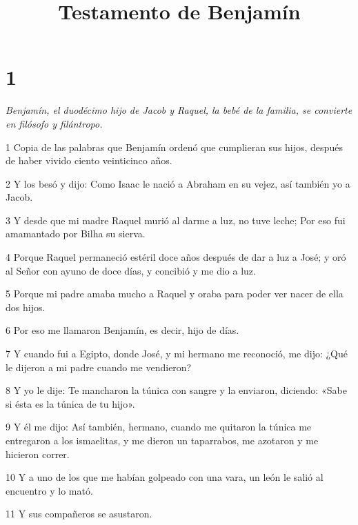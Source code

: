 

\title{Testamento de Benjamín}

\chapter{1}

\par \textit{Benjamín, el duodécimo hijo de Jacob y Raquel, la bebé de la familia, se convierte en filósofo y filántropo.}

\par 1 Copia de las palabras que Benjamín ordenó que cumplieran sus hijos, después de haber vivido ciento veinticinco años.

\par 2 Y los besó y dijo: Como Isaac le nació a Abraham en su vejez, así también yo a Jacob.

\par 3 Y desde que mi madre Raquel murió al darme a luz, no tuve leche; Por eso fui amamantado por Bilha su sierva.

\par 4 Porque Raquel permaneció estéril doce años después de dar a luz a José; y oró al Señor con ayuno de doce días, y concibió y me dio a luz.

\par 5 Porque mi padre amaba mucho a Raquel y oraba para poder ver nacer de ella dos hijos.

\par 6 Por eso me llamaron Benjamín, es decir, hijo de días.

\par 7 Y cuando fui a Egipto, donde José, y mi hermano me reconoció, me dijo: ¿Qué le dijeron a mi padre cuando me vendieron?

\par 8 Y yo le dije: Te mancharon la túnica con sangre y la enviaron, diciendo: «Sabe si ésta es la túnica de tu hijo».

\par 9 Y él me dijo: Así también, hermano, cuando me quitaron la túnica me entregaron a los ismaelitas, y me dieron un taparrabos, me azotaron y me hicieron correr.

\par 10 Y a uno de los que me habían golpeado con una vara, un león le salió al encuentro y lo mató.

\par 11 Y sus compañeros se asustaron.

